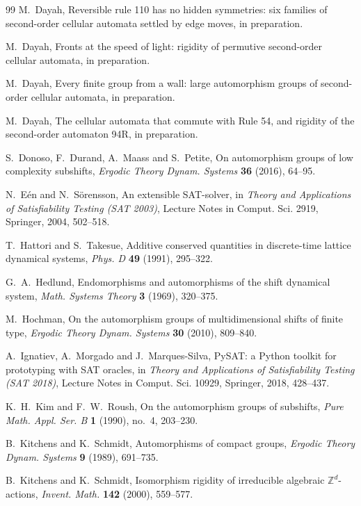 \begin{thebibliography}{99}
 M.~Dayah, Reversible rule 110 has no hidden symmetries: six families of second-order cellular automata settled by edge moves, in preparation.

 M.~Dayah, Fronts at the speed of light: rigidity of permutive second-order cellular automata, in preparation.

 M.~Dayah, Every finite group from a wall: large automorphism groups of second-order cellular automata, in preparation.

 M.~Dayah, The cellular automata that commute with Rule 54, and rigidity of the second-order automaton 94R, in preparation.

 S.~Donoso, F.~Durand, A.~Maass and S.~Petite, On automorphism groups of low complexity subshifts, \emph{Ergodic Theory Dynam. Systems} \textbf{36} (2016), 64--95.

 N.~E\'en and N.~S\"orensson, An extensible SAT-solver, in \emph{Theory and Applications of Satisfiability Testing (SAT 2003)}, Lecture Notes in Comput. Sci. 2919, Springer, 2004, 502--518.

 T.~Hattori and S.~Takesue, Additive conserved quantities in discrete-time lattice dynamical systems, \emph{Phys. D} \textbf{49} (1991), 295--322.

 G.~A.~Hedlund, Endomorphisms and automorphisms of the shift dynamical system, \emph{Math. Systems Theory} \textbf{3} (1969), 320--375.

 M.~Hochman, On the automorphism groups of multidimensional shifts of finite type, \emph{Ergodic Theory Dynam. Systems} \textbf{30} (2010), 809--840.

 A.~Ignatiev, A.~Morgado and J.~Marques-Silva, PySAT: a Python toolkit for prototyping with SAT oracles, in \emph{Theory and Applications of Satisfiability Testing (SAT 2018)}, Lecture Notes in Comput. Sci. 10929, Springer, 2018, 428--437.

 K.~H.~Kim and F.~W.~Roush, On the automorphism groups of subshifts, \emph{Pure Math. Appl. Ser. B} \textbf{1} (1990), no.~4, 203--230.

 B.~Kitchens and K.~Schmidt, Automorphisms of compact groups, \emph{Ergodic Theory Dynam. Systems} \textbf{9} (1989), 691--735.

 B.~Kitchens and K.~Schmidt, Isomorphism rigidity of irreducible algebraic $\mathbb{Z}^d$-actions, \emph{Invent. Math.} \textbf{142} (2000), 559--577.


\end{thebibliography}
